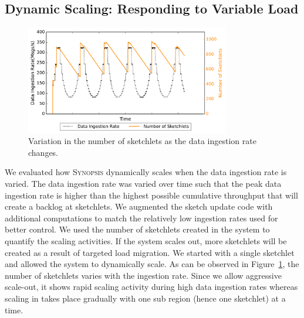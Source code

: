 \subsection{Dynamic Scaling: Responding to Variable Load}
\begin{figure}[b!]
    \centerline{\includegraphics[width=3.5in]{figures/dyn-scaling.pdf}}
    \caption{Variation in the number of sketchlets as the data ingestion rate changes.}
    \label{fig:dyn-scaling}
\end{figure}
We evaluated how \textsc{Synopsis} dynamically scales when the data ingestion rate is varied.
The data ingestion rate was varied over time such that the peak data ingestion rate is higher than the highest possible cumulative throughput that will create a backlog at sketchlets.
We augmented the sketch update code with additional computations to match the relatively low ingestion rates used for better control.
We used the number of sketchlets created in the system to quantify the scaling activities.
If the system scales out, more sketchlets will be created as a result of targeted load migration.
We started with a single sketchlet and allowed the system to dynamically scale.
As can be observed in Figure~\ref{fig:dyn-scaling}, the number of sketchlets varies with the ingestion rate.
Since we allow aggressive scale-out, it shows rapid scaling activity during high data ingestion rates whereas scaling in takes place gradually with one sub region (hence one sketchlet) at a time.

